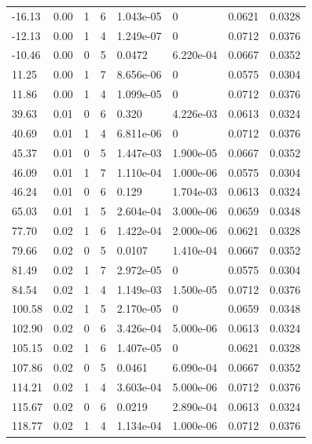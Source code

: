 \documentclass[preview]{standalone}
\begin{document}
{{\begin{tabular}{L{1.2cm}C{1.2cm} C{0.3cm}C{0.5cm} C{1.4cm}C{1.4cm} C{1.4cm}C{1.4cm}}
  -16.13  &  0.00  & 1     &  6 &  1.043e-05  & 0  & 0.0621 &  0.0328   \\ 
  -12.13  &  0.00  & 1     &  4 &  1.249e-07  & 0  & 0.0712 &  0.0376   \\ 
  -10.46  &  0.00  & 0     &  5 &  0.0472  & 6.220e-04  & 0.0667 &  0.0352   \\ 
  11.25  &  0.00  & 1     &  7 &  8.656e-06  & 0  & 0.0575 &  0.0304   \\ 
  11.86  &  0.00  & 1     &  4 &  1.099e-05  & 0  & 0.0712 &  0.0376   \\ 
  39.63  &  0.01  & 0     &  6 &  0.320  & 4.226e-03  & 0.0613 &  0.0324   \\ 
  40.69  &  0.01  & 1     &  4 &  6.811e-06  & 0  & 0.0712 &  0.0376   \\ 
  45.37  &  0.01  & 0     &  5 &  1.447e-03  & 1.900e-05  & 0.0667 &  0.0352   \\ 
  46.09  &  0.01  & 1     &  7 &  1.110e-04  & 1.000e-06  & 0.0575 &  0.0304   \\ 
  46.24  &  0.01  & 0     &  6 &  0.129  & 1.704e-03  & 0.0613 &  0.0324   \\ 
  65.03  &  0.01  & 1     &  5 &  2.604e-04  & 3.000e-06  & 0.0659 &  0.0348   \\ 
  77.70  &  0.02  & 1     &  6 &  1.422e-04  & 2.000e-06  & 0.0621 &  0.0328   \\ 
  79.66  &  0.02  & 0     &  5 &  0.0107  & 1.410e-04  & 0.0667 &  0.0352   \\ 
  81.49  &  0.02  & 1     &  7 &  2.972e-05  & 0  & 0.0575 &  0.0304   \\ 
  84.54  &  0.02  & 1     &  4 &  1.149e-03  & 1.500e-05  & 0.0712 &  0.0376   \\ 
  100.58  &  0.02  & 1     &  5 &  2.170e-05  & 0  & 0.0659 &  0.0348   \\ 
  102.90  &  0.02  & 0     &  6 &  3.426e-04  & 5.000e-06  & 0.0613 &  0.0324   \\ 
  105.15  &  0.02  & 1     &  6 &  1.407e-05  & 0  & 0.0621 &  0.0328   \\ 
  107.86  &  0.02  & 0     &  5 &  0.0461  & 6.090e-04  & 0.0667 &  0.0352   \\ 
  114.21  &  0.02  & 1     &  4 &  3.603e-04  & 5.000e-06  & 0.0712 &  0.0376   \\ 
  115.67  &  0.02  & 0     &  6 &  0.0219  & 2.890e-04  & 0.0613 &  0.0324   \\ 
  118.77  &  0.02  & 1     &  4 &  1.134e-04  & 1.000e-06  & 0.0712 &  0.0376   \\ 

\end{tabular}}}
\end{document}
